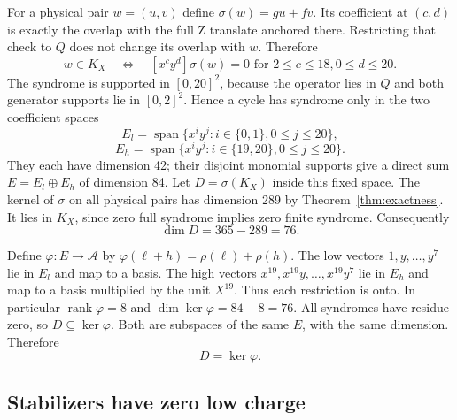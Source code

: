 \documentclass{article}
\DeclareMathOperator{\rank}{rank}
\DeclareMathOperator{\Span}{span}
\begin{document}
For a physical pair \(w = (u, v)\) define \(\sigma(w) = gu + fv\). Its coefficient at
\((c,d)\) is exactly the overlap with the full Z translate anchored there. Restricting that
check to \(Q\) does not change its overlap with \(w\). Therefore
\begin{equation}
  w \in K_X \quad \Longleftrightarrow \quad
  [x^c y^d]\sigma(w) = 0
  \text{ for } 2 \le c \le 18, 0 \le d \le 20.
\end{equation}
The syndrome is supported in \([0,20]^2\), because the operator lies in \(Q\) and both
generator supports lie in \([0,2]^2\). Hence a cycle has syndrome only in the two
coefficient spaces
\begin{equation}
  E_l = \Span\{x^i y^j : i \in \{0,1\}, 0 \le j \le 20\},
\end{equation}
\begin{equation}
  E_h = \Span\{x^i y^j : i \in \{19,20\}, 0 \le j \le 20\}.
\end{equation}
They each have dimension 42; their disjoint monomial supports give a direct sum
\(E = E_l \oplus E_h\) of dimension 84. Let \(D = \sigma(K_X)\) inside this fixed space. The
kernel of \(\sigma\) on all physical pairs has dimension 289 by Theorem~\ref{thm:exactness}.
It lies in \(K_X\), since zero full syndrome implies zero finite syndrome. Consequently
\begin{equation}
  \dim D = 365 - 289 = 76.
\end{equation}

Define \(\varphi \colon E \to \mathcal{A}\) by \(\varphi(\ell + h) = \rho(\ell) + \rho(h)\).
The low vectors \(1, y, \dots, y^7\) lie in \(E_l\) and map to a basis. The high vectors
\(x^{19}, x^{19} y, \dots, x^{19} y^7\) lie in \(E_h\) and map to a basis multiplied by the
unit \(X^{19}\). Thus each restriction is onto. In particular \(\rank \varphi = 8\) and
\(\dim \ker \varphi = 84 - 8 = 76\). All syndromes have residue zero, so
\(D \subseteq \ker \varphi\). Both are subspaces of the same \(E\), with the same dimension.
Therefore
\begin{equation}
  D = \ker \varphi.
\end{equation}

\subsection{Stabilizers have zero low charge}\label{sec:x-stabilizers}
\end{document}
